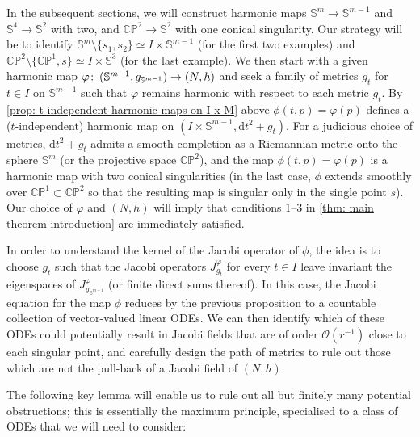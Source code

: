\documentclass{article}
\numberwithin{equation}{section}        %
\theoremstyle{bfnote}
\theoremstyle{definition}
\theoremstyle{bfremark}
\newcommand{\col}{\colon \thinspace}        %
\newcommand{\Sp}{\mathbb{S}}                %
\newcommand{\diff}{\mathrm{d}}                      %
\begin{document}
In the subsequent sections, we will construct harmonic maps $\Sp^m \to \Sp^{m-1}$ and $\Sp^4 \to \Sp^2$ with two, and $\mathbb{CP}^2 \to \Sp^2$ with one conical singularity. Our strategy will be to identify $\Sp^m \setminus \{s_1,s_2 \} \simeq I \times \Sp^{m-1}$ (for the first two examples)  and $\mathbb{CP}^2 \setminus \{ \mathbb{CP}^1,s\} \simeq I \times \Sp^3$ (for the last example). We then start with a given harmonic map $\varphi \col (\mathbb{S}^{m-1},g_{\mathbb{S}^{m-1}}) \rightarrow (N,h)$ and seek a family of metrics $g_t$ for $t \in I$ on $\mathbb{S}^{m-1}$ such that $\varphi$ remains harmonic with respect to each metric $g_t$. By \cref{prop: t-independent harmonic maps on I x M} above $\phi(t,p) = \varphi(p)$ defines a ($t$-independent) harmonic map on $(I \times \Sp^{m-1}, \diff t^2+ g_t)$. For a judicious choice of metrics, $\diff t^2 + g_t$ admits a smooth completion as a Riemannian metric onto the sphere $\Sp^m$ (or the projective space $\mathbb{CP}^2$), and the map $\phi(t,p) = \varphi(p)$ is a harmonic map with two conical singularities (in the last case, $\phi$ extends smoothly over $\mathbb{CP}^1 \subset \mathbb{CP}^2$ so that the resulting map is singular only in the single point $s$). Our choice of $\varphi$ and $(N,h)$ will imply that conditions 1--3 in \cref{thm: main theorem introduction} are immediately satisfied. 

In order to understand the kernel of the Jacobi operator of $\phi$, the idea is to choose $g_t$ such that the Jacobi operators $J^\varphi_{g_t}$ for every $t\in I$ leave invariant the eigenspaces of $J^\varphi_{g_{\Sp^{m-1}}}$ (or finite direct sums thereof). In this case, the Jacobi equation for the map $\phi$ reduces by the previous proposition to a countable collection of vector-valued linear ODEs. We can then identify which of these ODEs could potentially result in Jacobi fields that are of order $\mathcal{O}(r^{-1})$ close to each singular point, and carefully design the path of metrics to rule out those which are not the pull-back of a Jacobi field of $(N,h)$.

The following key lemma will enable us to rule out all but finitely many potential obstructions; this is essentially the maximum principle, specialised to a class of ODEs that we will need to consider:
\end{document}
